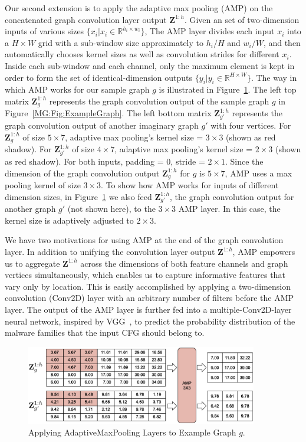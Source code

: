 Our second extension is to apply the adaptive max pooling (AMP) on the concatenated graph convolution layer output $\mathbf{Z}^{1:h}$.
Given an set of two-dimension inputs of various sizes $\{x_i | x_i \in \mathbb{R}^{h_i \times w_i}\}$,
The AMP layer divides each input $x_i$ into a $H \times W$ grid with a sub-window size approximately to $h_i / H$ and $w_i / W$,
and then automatically chooses kernel sizes as well as convolution strides for different $x_i$.
Inside each sub-window and each channel, only the maximum element is kept in order to form the set of identical-dimension outputs $\{y_i | y_i \in \mathbb{R}^{ H \times W}\}$.
The way in which AMP works for our sample graph $g$ is illustrated in Figure~\ref{MG:Fig:ExampleAmp}.
The left top matrix $\mathbf{Z}^{1:h}_g$ represents the graph convolution output of the sample graph $g$ in Figure~\ref{MG:Fig:ExampleGraph}.
The left bottom matrix $\mathbf{Z}^{1:h}_{g'}$ represents the graph convolution output of another imaginary graph $g'$ with four vertices.
For $\mathbf{Z}^{1:h}_g$ of size $5\times 7$, adaptive max pooling's kernel size = $3 \times 3$ (shown as red shadow).
For $\mathbf{Z}^{1:h}_{g'}$ of size $4\times 7$, adaptive max pooling's kernel size = $2 \times 3$ (shown as red shadow).
For both inputs, padding = 0, stride = $2 \times 1$.
Since the dimension of the graph convolution output $\mathbf{Z}^{1:h}_g$ for $g$ is $5 \times 7$, AMP uses a max pooling kernel of size $3 \times 3$.
To show how AMP works for inputs of different dimension sizes, in Figure~\ref{MG:Fig:ExampleAmp} we also feed $\mathbf{Z}^{1:h}_{g'}$,
the graph convolution output for another graph $g'$ (not shown here), to the $3 \times 3$ AMP layer.
In this case, the kernel size is adaptively adjusted to $2 \times 3$.

We have two motivations for using AMP at the end of the graph convolution layer.
In addition to unifying the convolution layer output $\mathbf{Z}^{1:h}$, AMP empowers us to aggregate $\mathbf{Z}^{1:h}$
across the dimensions of both feature channels and graph vertices simultaneously,
which enables us to capture informative features that vary only by location.
This is easily accomplished by applying a two-dimension convolution (Conv2D) layer with an arbitrary number of filters before the AMP layer.
The output of the AMP layer is further fed into a multiple-Conv2D-layer neural network, inspired by VGG~\cite{VGG}, to predict the probability distribution of the malware families that the input CFG should belong to.

\begin{figure}[htbp]
    \centerline{\includegraphics[width=0.90\textwidth]{Magic/figures/ExampleAmp.eps}}
    \caption{Applying AdaptiveMaxPooling Layers to Example Graph $g$.}
    \label{MG:Fig:ExampleAmp}
\end{figure}
